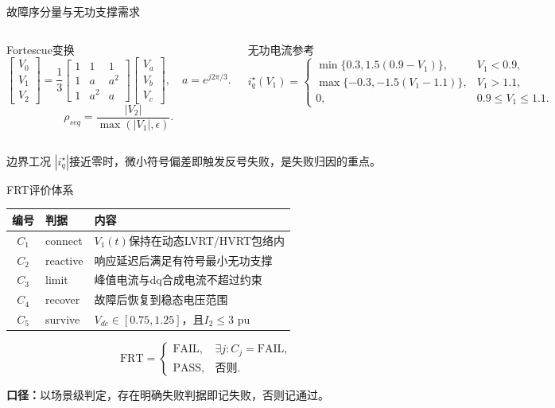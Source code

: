 \documentclass[10pt,aspectratio=169,mathserif]{beamer}
\newcommand{\pass}{\ensuremath{\mathrm{PASS}}}
\newcommand{\fail}{\ensuremath{\mathrm{FAIL}}}
\begin{document}
\begin{frame}{故障序分量与无功支撑需求}
\begin{columns}[T,onlytextwidth]
\begin{block}{Fortescue变换}
\[
\begin{bmatrix}V_0\\V_1\\V_2\end{bmatrix}
=\frac{1}{3}
\begin{bmatrix}1&1&1\\1&a&a^2\\1&a^2&a\end{bmatrix}
\begin{bmatrix}V_a\\V_b\\V_c\end{bmatrix},
\quad a=e^{j2\pi/3}.
\]
\[
\rho_{seq}=\frac{|V_2|}{\max(|V_1|,\epsilon)}.
\]
\end{block}

\begin{block}{无功电流参考}
\[
i_q^\star(V_1)=
\begin{cases}
\min\{0.3,1.5(0.9-V_1)\},&V_1<0.9,\\
\max\{-0.3,-1.5(V_1-1.1)\},&V_1>1.1,\\
0,&0.9\le V_1\le1.1.
\end{cases}
\]
\end{block}
\end{columns}

\begin{block}{边界工况}
$|i_q^\star|$接近零时，微小符号偏差即触发反号失败，是失败归因的重点。
\end{block}
\end{frame}

\begin{frame}{FRT评价体系}
\begin{table}
\centering\small
\begin{tabular}{cll}
\toprule
编号 & 判据 & 内容 \\
\midrule
$C_1$ & connect & $V_1(t)$保持在动态LVRT/HVRT包络内 \\
$C_2$ & reactive & 响应延迟后满足有符号最小无功支撑 \\
$C_3$ & limit & 峰值电流与dq合成电流不超过约束 \\
$C_4$ & recover & 故障后恢复到稳态电压范围 \\
$C_5$ & survive & $V_{dc}\in[0.75,1.25]$，且$I_2\le3$ pu \\
\bottomrule
\end{tabular}
\end{table}

\[
\mathrm{FRT}=
\begin{cases}
\fail,&\exists j:C_j=\fail,\\
\pass,&\text{否则}.
\end{cases}
\]

\medskip
\centering
\textbf{口径：}以场景级判定，存在明确失败判据即记失败，否则记通过。
\end{frame}
\end{document}
